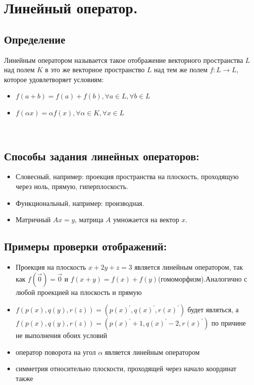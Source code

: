 \documentclass[12pt]{article}
\begin{document}
\section{Линейный оператор.}
\subsection{Определение}
Линейным оператором называется такое отображение векторного пространства $L$ над полем $K$ в это же векторное пространство $L$ над тем же полем $f: L \longrightarrow L $, которое удовлетворяет условиям:
\begin{itemize}
    \item $f(a+b)=f(a)+f(b), \forall a \in L, \forall b \in L$
    \item $f(\alpha x)=\alpha f(x), \forall \alpha \in K, \forall x \in L$
\end{itemize}
\\

\subsection{Способы задания линейных операторов:}
\begin{itemize}
    \item Словесный, например: проекция пространства на плоскость, проходящую через ноль, прямую, гиперплоскость.
    \item Функциональный, например: производная.
    \item Матричный $Ax=y$, матрица $A$ умножается на вектор $x$.
\end{itemize}
\subsection{Примеры проверки отображений:}
\begin{itemize}
    \item Проекция на плоскость $x+2y+z=3$ является линейным оператором, так как $f(\overrightarrow{0})= \overrightarrow{0}$ и $f(x+y)=f(x)+f(y)$(гомоморфизм).Аналогично с любой проекцией на плоскость и прямую
    \item $f(p(x),q(y),r(z))=(p(x)^{'},q(x)^{'},r(x)^{'})$ будет являться, а $f(p(x),q(y),r(z))=(p(x)^{'}+1,q(x)^{'}-2,r(x)^{'})$ по причине не выполнения обоих условий
    \item оператор поворота на угол $\alpha $ является линейным оператором
    \item симметрия относительно плоскости, проходящей через начало координат также
\end{itemize}
\end{document}
